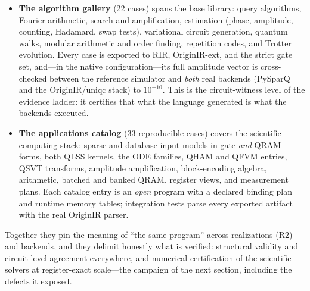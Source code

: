 \begin{itemize}
\item \textbf{The algorithm gallery} (22 cases) spans the base library:
  query algorithms, Fourier arithmetic, search and amplification,
  estimation (phase, amplitude, counting, Hadamard, swap tests), variational
  circuit generation, quantum walks, modular arithmetic and order finding,
  repetition codes, and Trotter evolution.  Every case is exported to RIR,
  OriginIR-ext, and the strict gate set, and---in the native
  configuration---its full amplitude vector is cross-checked between the
  reference simulator and \emph{both} real backends (PySparQ and the
  OriginIR/uniqc stack) to $10^{-10}$.  This is the circuit-witness level of
  the evidence ladder: it certifies that what the language generated is what
  the backends executed.
\item \textbf{The applications catalog} (33 reproducible cases) covers the
  scientific-computing stack: sparse and database input models in gate
  \emph{and} QRAM forms, both QLSS kernels, the ODE families, QHAM and QFVM
  entries, QSVT transforms, amplitude amplification, block-encoding
  algebra, arithmetic, batched and banked QRAM, register views, and
  measurement plans.  Each catalog entry is an \emph{open} program with a
  declared binding plan and runtime memory tables; integration tests parse
  every exported artifact with the real OriginIR parser.
\end{itemize}

Together they pin the meaning of ``the same program'' across realizations
(R2) and backends, and they delimit honestly what is verified: structural
validity and circuit-level agreement everywhere, and numerical
certification of the scientific solvers at register-exact scale---the
campaign of the next section, including the defects it exposed.
